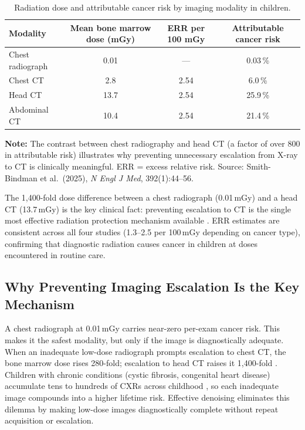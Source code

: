 \documentclass[12pt, a4paper, twoside, openright]{book}
\begin{document}
\begin{table}[H]
  \centering
  \caption{Radiation dose and attributable cancer risk by imaging modality in children.}
  \label{tab:lit:dose}
  \small
  \begin{tabular}{l c c c}
    \toprule
    \textbf{Modality} &
    \textbf{Mean bone marrow dose (mGy)} &
    \textbf{ERR per 100 mGy} &
    \textbf{Attributable cancer risk} \\
    \midrule
    Chest radiograph & 0.01 & --- & 0.03\,\% \\
    Chest CT          & 2.8  & 2.54 & 6.0\,\% \\
    Head CT           & 13.7 & 2.54 & 25.9\,\% \\
    Abdominal CT      & 10.4 & 2.54 & 21.4\,\% \\
    \bottomrule
  \end{tabular}

  \vspace{0.01em}
  {\footnotesize \textbf{Note:} The contrast between chest radiography and head CT (a factor
  of over 800 in attributable risk) illustrates why preventing unnecessary escalation from
  X-ray to CT is clinically meaningful. ERR = excess relative risk. Source: Smith-Bindman 
  et al.\ (2025), \textit{N Engl J Med}, 392(1):44--56.}
\end{table}

The 1,400-fold dose difference between a chest radiograph (0.01\,mGy) and a head CT (13.7\,mGy) is the key clinical fact: preventing escalation to CT is the single most effective radiation protection mechanism available \cite{smith-bindman_hematologic_2025}. ERR estimates are consistent across all four studies (1.3--2.5 per 100\,mGy depending on cancer type), confirming that diagnostic radiation causes cancer in children at doses encountered in routine care.

\subsection{Why Preventing Imaging Escalation Is the Key Mechanism}
\label{sec:lit:radiation:escalation}

A chest radiograph at 0.01\,mGy carries near-zero per-exam cancer risk. This makes it the safest modality, but only if the image is diagnostically adequate. When an inadequate low-dose radiograph prompts escalation to chest CT, the bone marrow dose rises 280-fold; escalation to head CT raises it 1,400-fold \cite{smith-bindman_hematologic_2025}. Children with chronic conditions (cystic fibrosis, congenital heart disease) accumulate tens to hundreds of CXRs across childhood \cite{johnson_cumulative_2014}, so each inadequate image compounds into a higher lifetime risk. Effective denoising eliminates this dilemma by making low-dose images diagnostically complete without repeat acquisition or escalation.
\end{document}
